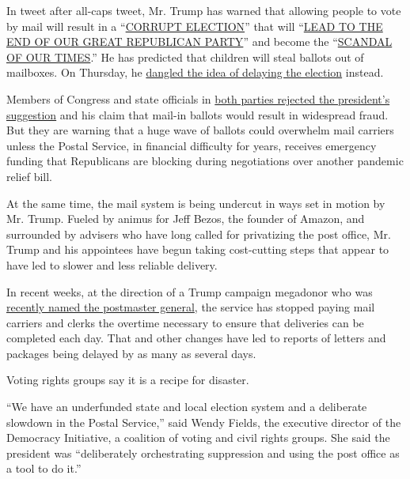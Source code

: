 In tweet after all-caps tweet, Mr. Trump has warned that allowing people
to vote by mail will result in a
``\href{https://twitter.com/realDonaldTrump/status/1285540318503407622?s=20}{CORRUPT
ELECTION}'' that will
``\href{https://twitter.com/realDonaldTrump/status/1266172570983940101?s=20}{LEAD
TO THE END OF OUR GREAT REPUBLICAN PARTY}'' and become the
``\href{https://twitter.com/realDonaldTrump/status/1275024974579982336?s=20}{SCANDAL
OF OUR TIMES}.'' He has predicted that children will steal ballots out
of mailboxes. On Thursday, he
\href{https://twitter.com/realDonaldTrump/status/1288818160389558273}{dangled
the idea of delaying the election} instead.

Members of Congress and state officials in
\href{https://www.nytimes.com/2020/07/30/us/politics/trump-delay-2020-election.html}{both
parties rejected the president's suggestion} and his claim that mail-in
ballots would result in widespread fraud. But they are warning that a
huge wave of ballots could overwhelm mail carriers unless the Postal
Service, in financial difficulty for years, receives emergency funding
that Republicans are blocking during negotiations over another pandemic
relief bill.

At the same time, the mail system is being undercut in ways set in
motion by Mr. Trump. Fueled by animus for Jeff Bezos, the founder of
Amazon, and surrounded by advisers who have long called for privatizing
the post office, Mr. Trump and his appointees have begun taking
cost-cutting steps that appear to have led to slower and less reliable
delivery.

In recent weeks, at the direction of a Trump campaign megadonor who was
\href{https://www.nytimes.com/2020/05/07/us/politics/postmaster-general-louis-dejoy.html}{recently
named the postmaster general}, the service has stopped paying mail
carriers and clerks the overtime necessary to ensure that deliveries can
be completed each day. That and other changes have led to reports of
letters and packages being delayed by as many as several days.

Voting rights groups say it is a recipe for disaster.

``We have an underfunded state and local election system and a
deliberate slowdown in the Postal Service,'' said Wendy Fields, the
executive director of the Democracy Initiative, a coalition of voting
and civil rights groups. She said the president was ``deliberately
orchestrating suppression and using the post office as a tool to do
it.''

